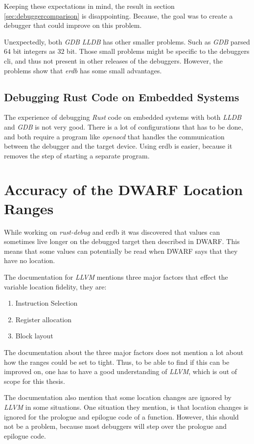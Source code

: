 Keeping these expectations in mind, the result in section \ref{sec:debuggercomparison} is disappointing.
Because, the goal was to create a debugger that could improve on this problem.


Unexpectedly, both \emph{GDB} \emph{LLDB} has other smaller problems.
Such as \emph{GDB} parsed $64$ bit integers as $32$ bit.
Those small problems might be specific to the debuggers \gls{cli}, and thus not present in other releases of the debuggers.
However, the problems show that \emph{erdb} has some small advantages.


\subsection{Debugging Rust Code on Embedded Systems}
The experience of debugging \emph{Rust} code on embedded systems with both \emph{LLDB} and \emph{GDB} is not very good.
There is a lot of configurations that has to be done, and both require a program like \emph{openocd} that handles the communication between the debugger and the target device.
Using \gls{erdb} is easier, because it removes the step of starting a separate program.


\section{Accuracy of the \gls{DWARF} Location Ranges}\label{section:loc-ranges}
While working on \emph{rust-debug} and \gls{erdb} it was discovered that values can sometimes live longer on the debugged target then described in \gls{DWARF}.
This means that some values can potentially be read when \gls{DWARF} says that they have no location.


The documentation for \emph{LLVM} \cite{llvm-dbs} mentions three major factors that effect the variable location fidelity, they are:

\begin{enumerate}
  \item Instruction Selection
  \item Register allocation
  \item Block layout
\end{enumerate}

The documentation about the three major factors does not mention a lot about how the ranges could be set to tight.
Thus, to be able to find if this can be improved on, one has to have a good understanding of \emph{LLVM}, which is out of scope for this thesis.


The documentation also mention that some location changes are ignored by \emph{LLVM} in some situations.
One situation they mention, is that location changes is ignored for the prologue and epilogue code of a function.
However, this should not be a problem, because most debuggers will step over the prologue and epilogue code.

